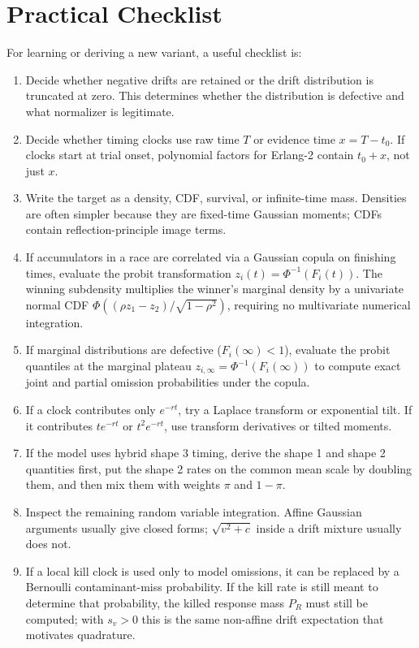 \documentclass[12pt]{article}
\newcommand{\PhiN}{\Phi}
\begin{document}
\section{Practical Checklist}
For learning or deriving a new variant, a useful checklist is:
\begin{enumerate}
  \item Decide whether negative drifts are retained or the drift distribution is truncated at zero. This determines whether the distribution is defective and what normalizer is legitimate.
  \item Decide whether timing clocks use raw time $T$ or evidence time $x=T-t_0$. If clocks start at trial onset, polynomial factors for Erlang-2 contain $t_0+x$, not just $x$.
  \item Write the target as a density, CDF, survival, or infinite-time mass. Densities are often simpler because they are fixed-time Gaussian moments; CDFs contain reflection-principle image terms.
  \item If accumulators in a race are correlated via a Gaussian copula on finishing times, evaluate the probit transformation $z_i(t) = \PhiN^{-1}(F_i(t))$. The winning subdensity multiplies the winner's marginal density by a univariate normal CDF $\PhiN((\rho z_1 - z_2)/\sqrt{1-\rho^2})$, requiring no multivariate numerical integration.
  \item If marginal distributions are defective ($F_i(\infty) < 1$), evaluate the probit quantiles at the marginal plateau $z_{i, \infty} = \PhiN^{-1}(F_i(\infty))$ to compute exact joint and partial omission probabilities under the copula.
  \item If a clock contributes only $e^{-rt}$, try a Laplace transform or exponential tilt. If it contributes $t e^{-rt}$ or $t^2e^{-rt}$, use transform derivatives or tilted moments.
  \item If the model uses hybrid shape 3 timing, derive the shape 1 and shape 2 quantities first, put the shape 2 rates on the common mean scale by doubling them, and then mix them with weights $\pi$ and $1-\pi$.
  \item Inspect the remaining random variable integration. Affine Gaussian arguments usually give closed forms; $\sqrt{v^2+c}$ inside a drift mixture usually does not.
  \item If a local kill clock is used only to model omissions, it can be replaced by a Bernoulli contaminant-miss probability. If the kill rate is still meant to determine that probability, the killed response mass $P_R$ must still be computed; with $s_v>0$ this is the same non-affine drift expectation that motivates quadrature.
\end{enumerate}
\end{document}
